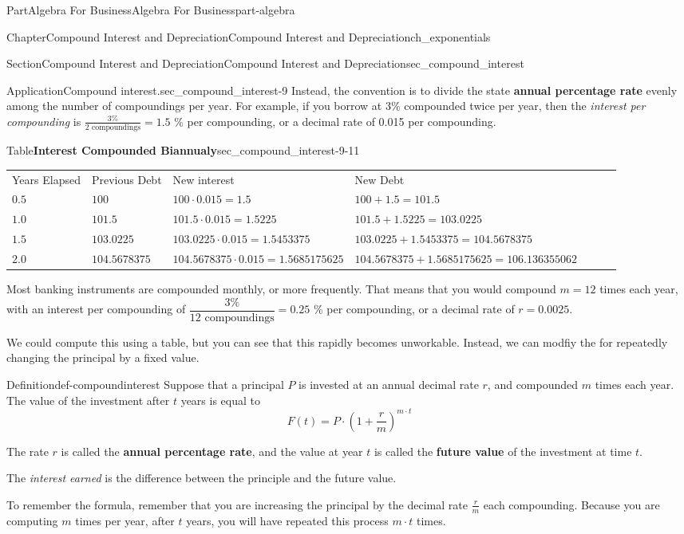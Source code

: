 \documentclass{tufte-book}
\newcommand{\tabularfont}{\relax}
\newcommand{\terminology}[1]{\textbf{#1}}
\numberwithin{equation}{chapter}
\newcommand{\hrulethin}  {\noalign{\hrule height 0.04em}}
\begin{document}
\begin{partptx}{Part}{Algebra For Business}{}{Algebra For Business}{}{}{part-algebra}
\begin{chapterptx}{Chapter}{Compound Interest and Depreciation}{}{Compound Interest and Depreciation}{}{}{ch_exponentials}
\begin{sectionptx}{Section}{Compound Interest and Depreciation}{}{Compound Interest and Depreciation}{}{}{sec_compound_interest}
\begin{insight}{Application}{Compound interest.}{sec_compound_interest-9}
Instead, the convention is to divide the state \terminology{annual percentage rate} evenly among the number of compoundings per year.  For example, if you borrow at 3\% compounded twice per year, then the \emph{interest per compounding} is \(\frac{3 \%}{2\text{ compoundings}} = 1.5\) \% per compounding, or a decimal rate of 0.015 per compounding.%
\begin{tableptx}{Table}{\textbf{Interest Compounded Biannualy}}{sec_compound_interest-9-11}{}%
\centering%
{\tabularfont%
\begin{tabular}{lAlAlAl}
Years Elapsed&Previous Debt&New interest&New Debt\tabularnewline\hrulethin
\(0.5\)&\(100\)&\(100\cdot 0.015=1.5\)&\(100+1.5 = 101.5\)\tabularnewline\hrulethin
\(1.0\)&\(101.5\)&\(101.5\cdot 0.015=1.5225\)&\(101.5+1.5225=103.0225\)\tabularnewline\hrulethin
\(1.5\)&\(103.0225\)&\(103.0225\cdot 0.015=1.5453375 \)&\(103.0225+1.5453375=104.5678375\)\tabularnewline\hrulethin
\(2.0\)&\(104.5678375\)&\(104.5678375\cdot 0.015=1.5685175625\)&\(104.5678375+1.5685175625= 106.136355062 \)
\end{tabular}
}%
\end{tableptx}%
Most banking instruments are compounded monthly, or more frequently. That means that you would compound \(m=12\) times each year, with an interest per compounding of \(\dfrac{3\%}{12\text{ compoundings}}=0.25\) \% per compounding, or a decimal rate of \(r = 0.0025\).%
\par
We could compute this using a table, but you can see that this rapidly becomes unworkable.  Instead, we can modfiy the for repeatedly changing the principal by a fixed value.%
\end{insight}
\begin{definition}{Definition}{}{def-compoundinterest}%
Suppose that a principal \(P\) is invested at an annual decimal rate \(r\), and compounded \(m\) times each year.  The value of the investment after \(t\) years is equal to%
\begin{equation*}
F(t) = P \cdot \left(1 + \frac{r}{m}\right)^{m\cdot t}
\end{equation*}
%
\par
The rate \(r\) is called the \terminology{annual percentage rate}, and the value at year \(t\) is called the \terminology{future value} of the investment at time \(t\).%
\par
The \emph{interest earned} is the difference between the principle and the future value.%
\end{definition}
To remember the formula, remember that you are increasing the principal by the decimal rate \(\frac{r}{m}\) each compounding.  Because you are computing \(m\) times per year, after \(t\) years, you will have repeated this process \(m\cdot t\) times.%

\end{sectionptx}
\end{chapterptx}
\end{partptx}
\end{document}
